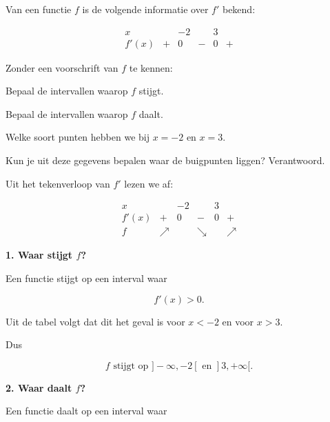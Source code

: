 \documentclass{ximera}
\begin{document}
\begin{oefening}{\oefU\ESS}

Van een functie $f$ is de volgende informatie over $f'$ bekend:

\[
\begin{array}{c|ccccc}
x
& 
& -2
&
& 3
& 
\\ \hline
f'(x)
& +
& 0
& -
& 0
& +
\end{array}
\]

Zonder een voorschrift van $f$ te kennen:

\begin{question}
Bepaal de intervallen waarop $f$ stijgt.
\end{question}

\begin{question}
Bepaal de intervallen waarop $f$ daalt.
\end{question}

\begin{question}
Welke soort punten  hebben we bij $x=-2$ en $x=3$.
\end{question}

\begin{question}
Kun je uit deze gegevens bepalen waar de buigpunten liggen?
Verantwoord.
\end{question}

\begin{oplossing}

  Uit het tekenverloop van $f'$ lezen we af:
  
  \[
  \begin{array}{c|ccccc}
  x
  &
  & -2
  &
  & 3
  &
  \\ \hline
  f'(x)
  & +
  & 0
  & -
  & 0
  & +
  \\
  f
  & \nearrow
  &
  & \searrow
  &
  & \nearrow
  \end{array}
  \]
  
  \textbf{1. Waar stijgt $f$?}
  
  Een functie stijgt op een interval waar
  
  \[
  f'(x)>0.
  \]
  
  Uit de tabel volgt dat dit het geval is voor $x<-2$ en voor $x>3$.
  
  Dus
  
  \[
  \boxed{
  f \text{ stijgt op }]-\infty,-2[
  \text{ en } ]3,+\infty[.
  }
  \]
  
  \textbf{2. Waar daalt $f$?}
  
  Een functie daalt op een interval waar
  

\end{oplossing}
\end{oefening}
\end{document}
